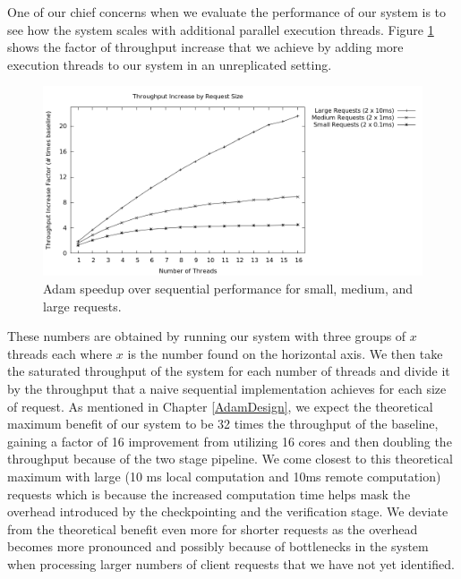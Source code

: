 \documentclass[11pt, oneside]{report}
\begin{document}
One of our chief concerns when we evaluate the performance of our system is to see how the system scales with additional parallel execution threads. Figure \ref{scaling} shows the factor of throughput increase that we achieve by adding more execution threads to our system in an unreplicated setting.

\begin{figure}[h]
\centering
\includegraphics[width=1.0\textwidth]{graphs/requestweights/graph.png}
\caption{\label{scaling}Adam speedup over sequential performance for small, medium, and large requests.}
\end{figure}

These numbers are obtained by running our system with three groups of $x$ threads each where $x$ is the number found on the horizontal axis. 
We then take the saturated throughput of the system for each number of threads and divide it by the throughput that a naive sequential implementation achieves for each size of request.
As mentioned in Chapter \ref{AdamDesign}, we expect the theoretical maximum benefit of our system to be 32 times the throughput of the baseline, gaining a factor of 16 improvement from utilizing 16 cores and then doubling the throughput because of the two stage pipeline.
We come closest to this theoretical maximum with large (10 ms local computation and 10ms remote computation) requests which is because the increased computation time helps mask the overhead introduced by the checkpointing and the verification stage.
We deviate from the theoretical benefit even more for shorter requests as the overhead becomes more pronounced and possibly because of bottlenecks in the system when processing larger numbers of client requests that we have not yet identified.
\end{document}

